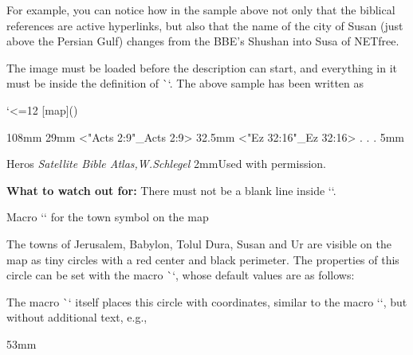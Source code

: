 \medskip
\centerline{\picw=200pt  \hss{} } 
\medskip
{}
\medskip
For example, you can notice how in the sample above not only that the biblical references are active hyperlinks, but also that the name of the city of Susan (just above the Persian Gulf) changes from the BBE's  Shushan into Susa of NETfree.

The image must be loaded before the description can start, and everything in it must be inside the definition of \`\insertBot`. 
The above sample has been written as

\begtt \catcode`<=12
[map](){
  \Heros \cond {}\rm %
  \vskip-1mm 
  \putstext 2mm 108mm {%
  }%
  \LMfonts\sans {}\rm
  \puttext 145mm 29mm {<"Acts 2:9"_Acts 2:9>}
  \puttext 145mm 32.5mm {<"Ez 32:16"_Ez 32:16>}
   .
   .
   .
  \puttext 2mm 5mm{{{{Heros \it Satellite Bible Atlas,\rm W.Schlegel}}
  \puttext 2mm 2mm{\Heros {}\rm Used with permission.}
}%
\endtt


{\bf What to watch out for:} 
 There must not be a blank line inside `\insertBot`.



\secc[town] Macro `\town` for the town symbol on the map


The towns of Jerusalem, Babylon, Tolul Dura, Susan and Ur are visible on the map as tiny circles 
with a red center and black perimeter.
The properties of this circle can be set with the macro \`\townparams`, whose default values are 
as follows:

\begtt
\def\townparams{
   \hhkern=.8pt %
   \lwidth=.5pt %
   \fcolor=\Red %
   \lcolor=\Black %
}
\endtt

The macro \`\town` itself places this circle with coordinates, similar to the macro `\puttext`, 
but without additional text, e.g.,

\begtt
  \town 101.5mm 53mm %
\endtt



}}
